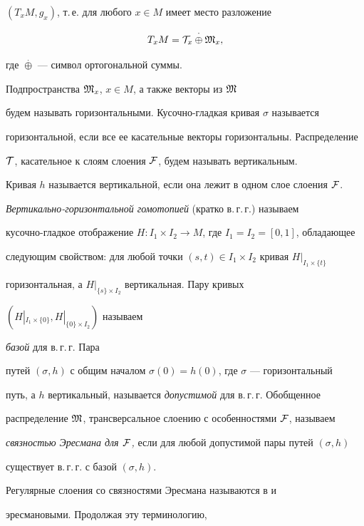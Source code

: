 $(T_xM, g_x)$, т.\,е. для любого $x\in M$ имеет место разложение


$$


T_xM={\cal T}_x\overset{\cdot}{\oplus}{}{\frak M}_x,


$$


где $\overset{\cdot}{\oplus}$ --- символ ортогональной суммы.


Подпространства ${\frak M}_x$, $x\in M$, а также векторы из $\frak M$


будем называть горизонтальными. Кусочно-гладкая кривая  $\sigma$ называется


горизонтальной, если все ее касательные векторы горизонтальны. Распределение


$\cal T$, касательное к слоям слоения $\cal F$, будем называть вертикальным.


Кривая $h$ называется вертикальной, если она лежит в одном слое слоения $\cal F$.





{\it Вертикально-горизонтальной гомотопией} (кратко в.\,г.\,г.) называем


кусочно-гладкое отображение $H: I_1\times I_2\to M$, где $I_1=I_2=[0,1]$, обладающее


следующим свойством: для любой точки $(s,t)\in I_1\times I_2$ кривая $H|_{I_1\times \{t\}}$


горизонтальная, а $H|_{\{s\}\times I_2}$ вертикальная. Пару кривых


$(H|_{I_1\times\{0\}}, H|_{\{0\}\times I_2})$ называем


{\it базой} для в.\,г.\,г. Пара


путей $(\sigma, h)$ с общим началом $\sigma (0)=h(0)$, где $\sigma$ --- горизонтальный


путь, а $h$ вертикальный, называется  {\it допустимой} для в.\,г.\,г. Обобщенное


распределение $\frak M$, трансверсальное слоению с особенностями $\cal F$, называем


{\it связностью Эресмана для $\cal F$,} если для любой допустимой пары путей $(\sigma, h)$


существует в.\,г.\,г. с базой $(\sigma, h)$.





Регулярные слоения со связностями Эресмана называются в \cite{Koi} и \cite{Z3}


эресмановыми. Продолжая эту терминологию,



